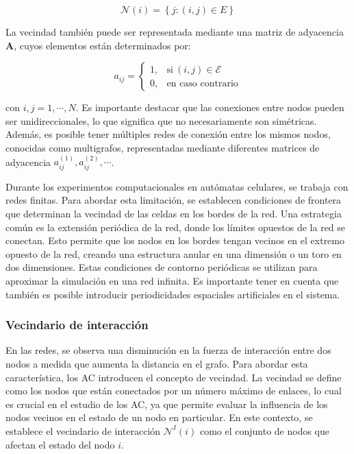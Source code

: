 \begin{equation}\label{eq:61}
	\mathcal{N}(i)= \left\{j:(i,j)\in E\right\}
\end{equation}

La vecindad también puede ser representada mediante una matriz de adyacencia $\bm{A}$, cuyos elementos están determinados por:

\begin{equation}\label{eq:62}
	a_{ij}=	\begin{cases}
		1, & \text{si} \ \left(i,j\right)\in \mathcal{E}\\
		0, & \text{en caso contrario}
	\end{cases}
\end{equation}

con $i, j = 1,\cdots, N$. Es importante destacar que las conexiones entre nodos pueden ser unidireccionales, lo que significa que no necesariamente son simétricas. Además, es posible tener múltiples redes de conexión entre los mismos nodos, conocidas como multigrafos, representadas mediante diferentes matrices de adyacencia $a_{ij}^{(1)} , a_{ij} ^{(2)}, \cdots$.

Durante los experimentos computacionales en autómatas celulares, se trabaja con redes finitas. Para abordar esta limitación, se establecen condiciones de frontera que determinan la vecindad de las celdas en los bordes de la red. Una estrategia común es la extensión periódica de la red, donde los límites opuestos de la red se conectan. Esto permite que los nodos en los bordes tengan vecinos en el extremo opuesto de la red, creando una estructura anular en una dimensión o un toro en dos dimensiones. Estas condiciones de contorno periódicas se utilizan para aproximar la simulación en una red infinita.  Es importante tener en cuenta que también es posible introducir periodicidades espaciales artificiales en el sistema.

\subsubsection{Vecindario de interacción}

En las redes, se observa una disminución en la fuerza de interacción entre dos nodos a medida que aumenta la distancia en el grafo. Para abordar esta característica, los AC introducen el concepto de vecindad. La vecindad se define como los nodos que están conectados por un número máximo de enlaces, lo cual es crucial en el estudio de los AC, ya que permite evaluar la influencia de los nodos vecinos en el estado de un nodo en particular. En este contexto, se establece el vecindario de interacción $\mathcal{N}^I(i)$ como el conjunto de nodos que afectan el estado del nodo $i$. 

